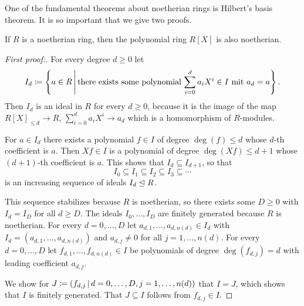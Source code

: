 \begin{fluff}
  One of the fundamental theorems about noetherian rings is Hilbert’s basis theorem.
  It is so important that we give two proofs.
\end{fluff}


\begin{theorem}
  \label{theorem: Hilberts basis theorem}
  If $R$ is a noetherian ring, then the polynomial ring $R[X]$ is also noetherian.
\end{theorem}


\begin{proof}[First proof:]
  For every degree $d \geq 0$ let
  \[
              I_d
    \coloneqq \left\{
                a \in R
              \suchthat*
                \text{there exists some polynomial $\sum_{i=0}^d a_i X^i \in I$ mit $a_d = a$}
              \right\}.
  \]
  Then $I_d$ is an ideal in $R$ for every $d \geq 0$, because it is the image of the map $R[X]_{\leq d} \to R$, $\sum_{i=0}^d a_i X^i \to a_d$ which is a homomorphism of $R$-modules.
  
  For $a \in I_d$ there exists a polynomial $f \in I$ of degree $\deg(f) \leq d$ whose $d$-th coefficient is $a$.
  Then $Xf \in I$ is a polynomial of degree $\deg(Xf) \leq d+1$ whose $(d+1)$-th coefficient is $a$.
  This shows that $I_d \subseteq I_{d+1}$, so that
  \[
              I_0
    \subseteq I_1
    \subseteq I_2
    \subseteq I_3
    \subseteq \dotsb
  \]
  is an increasing sequence of ideals $I_d \trianglelefteq R$.
  
  This sequence stabilizes because $R$ is noetherian, so there exists some $D \geq 0$ with $I_d = I_D$ for all $d \geq D$.
  The ideals $I_0, \dotsc, I_D$ are finitely generated because $R$ is noetherian.
  For every $d = 0, \dotsc, D$ let $a_{d,1}, \dotsc, a_{d,n(d)} \in I_d$ with $I_d = (a_{d,1}, \dotsc, a_{d,n(d)})$ and $a_{d,j} \neq 0$ for all $j = 1, \dotsc, n(d)$.
  For every $d = 0, \dotsc, D$ let $f_{d,1}, \dotsc, f_{d,n(d)} \in I$ be polynomials of degree $\deg(f_{d,j}) = d$ with leading coefficient $a_{d,j}$.
  
  We show for $J \defined (f_{d,j} \suchthat d = 0, \dotsc, D, j = 1, \dotsc, n(d))$ that $I = J$, which shows that $I$ is finitely generated.
  That $J \subseteq I$ follows from $f_{d,j} \in I$.
  

\end{proof}
